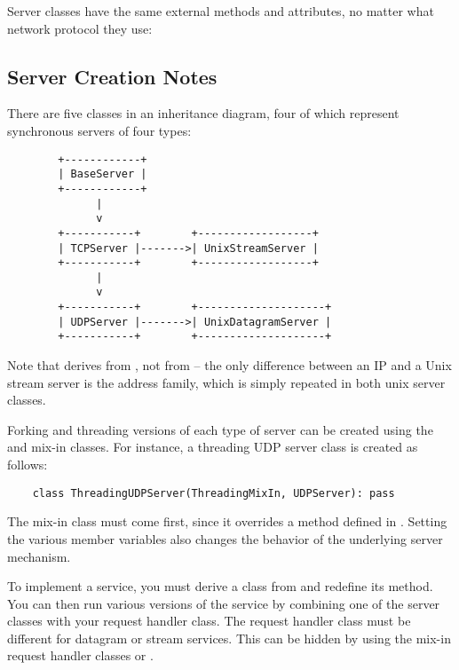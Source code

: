 Server classes have the same external methods and attributes, no
matter what network protocol they use:


\subsection{Server Creation Notes}

There are five classes in an inheritance diagram, four of which represent
synchronous servers of four types:

\begin{verbatim}
        +------------+
        | BaseServer |
        +------------+
              |
              v
        +-----------+        +------------------+
        | TCPServer |------->| UnixStreamServer |
        +-----------+        +------------------+
              |
              v
        +-----------+        +--------------------+
        | UDPServer |------->| UnixDatagramServer |
        +-----------+        +--------------------+
\end{verbatim}

Note that  derives from , not
from  -- the only difference between an IP and a
Unix stream server is the address family, which is simply repeated in both
unix server classes.

Forking and threading versions of each type of server can be created using
the  and  mix-in classes.  For
instance, a threading UDP server class is created as follows:

\begin{verbatim}
    class ThreadingUDPServer(ThreadingMixIn, UDPServer): pass
\end{verbatim}

The mix-in class must come first, since it overrides a method defined in
.  Setting the various member variables also changes the
behavior of the underlying server mechanism.

To implement a service, you must derive a class from
 and redefine its  method.  You
can then run various versions of the service by combining one of the server
classes with your request handler class.  The request handler class must be
different for datagram or stream services.  This can be hidden by using the
mix-in request handler classes  or
.

